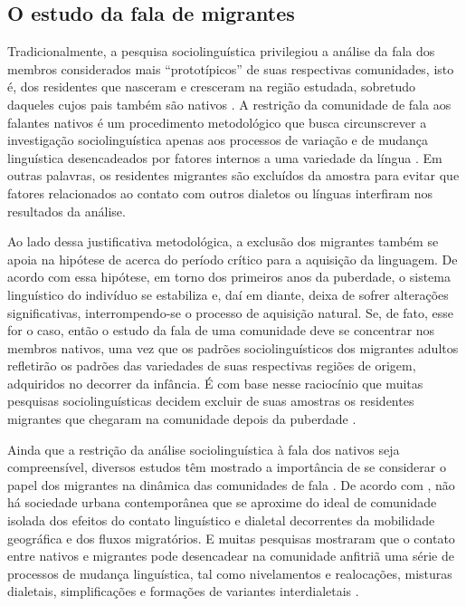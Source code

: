 \documentclass[12pt,a4paper,oneside]{article}
\begin{document}
    \subsection{O estudo da fala de migrantes}

    Tradicionalmente, a pesquisa sociolinguística privilegiou a análise da fala dos membros
    considerados mais \enquote{prototípicos} de suas respectivas comunidades, isto é, dos
    residentes que nasceram e cresceram na região estudada, sobretudo daqueles cujos pais
    também são nativos \citep{Britain2018, Oushiro2016, Milroy2002, Kerswill1993}.  A restrição
    da comunidade de fala aos falantes nativos é um procedimento metodológico que busca
    circunscrever a investigação sociolinguística apenas aos processos de variação e de
    mudança linguística desencadeados por fatores internos a uma variedade da língua
    \citep[p. 20]{Milroy2002, Labov2001}.  Em outras palavras, os residentes migrantes são
    excluídos da amostra para evitar que fatores relacionados ao contato com outros dialetos
    ou línguas interfiram nos resultados da análise.

    Ao lado dessa justificativa metodológica, a exclusão dos migrantes também se apoia na
    hipótese de \citet{Lenneberg1967} acerca do período crítico para a aquisição da
    linguagem. De acordo com essa hipótese, em torno dos primeiros anos da puberdade, o
    sistema linguístico do indivíduo se estabiliza e, daí em diante, deixa de sofrer
    alterações significativas, interrompendo-se o processo de aquisição natural. Se, de
    fato, esse for o caso, então o estudo da fala de uma comunidade deve se concentrar nos
    membros nativos, uma vez que os padrões sociolinguísticos dos migrantes adultos
    refletirão os padrões das variedades de suas respectivas regiões de origem, adquiridos
    no decorrer da infância. É com base nesse raciocínio que muitas pesquisas
    sociolinguísticas decidem excluir de suas amostras os residentes migrantes que chegaram
    na comunidade depois da puberdade \citep[p. ex.,][p. 111]{Labov1966}.

    Ainda que a restrição da análise sociolinguística à fala dos nativos seja compreensível,
    diversos estudos têm mostrado a importância de se considerar o papel dos migrantes na
    dinâmica das comunidades de fala \citep{Britain2018,Bortoni-Ricardo2011,Trudgill1986}.
    De acordo com \citet{Milroy2002}, não há sociedade urbana contemporânea que se aproxime
    do ideal de comunidade isolada dos efeitos do contato linguístico e dialetal decorrentes
    da mobilidade geográfica e dos fluxos migratórios. E muitas pesquisas mostraram que o
    contato entre nativos e migrantes pode desencadear na comunidade anfitriã uma série de
    processos de mudança linguística, tal como nivelamentos e realocações, misturas
    dialetais, simplificações e formações de variantes interdialetais \citep{Trudgill1986}.
\end{document}
